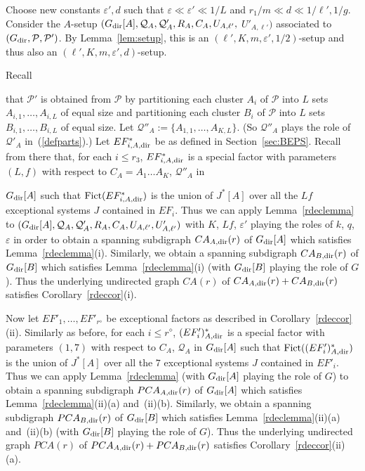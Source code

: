 \documentclass{memo-l}
\def\COMMENT#1{}
\def\cP{\mathcal{P}}
\def\eps{\varepsilon}
\numberwithin{section}{chapter}
\numberwithin{equation}{section}
\numberwithin{firstthm}{section}
\numberwithin{figure}{section}
\begin{document}
{\removelastskip{}\medskip{}
Choose  new constants $\eps', d$ such that $\eps\ll \eps'\ll 1/L$ and $r_1/m\ll d\ll 1/\ell',1/g$.
Consider the $A$-setup $(G_{\rm dir}[A], \mathcal{Q}_A , \mathcal{Q}'_A ,R_{A},C_{A},U_{A,\ell'},$ $U'_{A,\ell'})$ associated to $(G_{\rm dir},\cP,\cP')$.
By Lemma~\ref{lem:setup}, this
is an $(\ell',K,m,\eps',1/2)$-setup and thus also an $(\ell',K,m,\eps',d)$-setup.

Recall%
    \COMMENT{Daniela: new stuff}
that $\mathcal{P}'$ is obtained from $\mathcal{P}$ by partitioning each cluster $A_i$ of $\mathcal{P}$ into $L$ sets $A_{i,1},\dots,A_{i,L}$
of equal size and partitioning each cluster $B_i$ of $\mathcal{P}$ into $L$ sets $B_{i,1},\dots,B_{i,L}$ of equal size.
Let $\mathcal{Q}''_A:=\{A_{1,1},\dots,A_{K,L}\}$. (So $\mathcal{Q}''_A$ plays the role of $\mathcal{Q}'_A$ in~(\ref{defparts}).)
Let $EF^*_{i,A,{\rm dir}}$ be as defined in Section~\ref{sec:BEPS}.
Recall from there that, for each $i\le r_3$, $EF^*_{i,A,{\rm dir}}$ is a special factor with parameters $(L,f)$ with respect to
$C_A =A_1 \dots A_K$, $\mathcal{Q}''_A$ in%
    \COMMENT{Daniela: replaced $\mathcal{Q}'_A$ by $\mathcal{Q}''_A$}
$G_{\rm dir}[A]$ such that
${\rm Fict}(EF^*_{i,A,{\rm dir}})$ is the union of $J^*[A]$ over all the $Lf$ exceptional systems $J$ contained in $EF_{i}$.
Thus we can apply Lemma~\ref{rdeclemma} to $(G_{\rm dir}[A], \mathcal{Q}_A , \mathcal{Q}'_A ,R_{A},C_{A},U_{A,\ell'},U'_{A,\ell'})$
with $K$, $Lf$, $\eps'$ playing the roles of $k$, $q$, $\eps$ in order to obtain a spanning subdigraph $CA_{A,{\rm dir}}(r)$
of $G_{\rm dir}[A]$ which satisfies Lemma~\ref{rdeclemma}(i). 
Similarly, we obtain a spanning subdigraph $CA_{B,{\rm dir}}(r)$ of $G_{\rm dir}[B]$ which satisfies Lemma~\ref{rdeclemma}(i)
(with $G_{{\rm dir}}[B]$ playing the role of $G$). 
Thus the underlying undirected graph $CA(r)$ of $CA_{A,{\rm dir}}(r) + CA_{B,{\rm dir}}(r)$ satisfies Corollary~\ref{rdeccor}(i). 

Now let $EF'_1,\dots, EF'_{r^\diamond}$ be exceptional factors as described in Corollary~\ref{rdeccor}(ii).
Similarly as before, for each $i\le r^\diamond$, $(EF'_i)^*_{A,{\rm dir}}$ is a special factor
with parameters $(1,7)$ with respect to $C_A$, $\mathcal{Q}_A$ in $G_{\rm dir}[A]$ such that
${\rm Fict}((EF'_i)^*_{A,{\rm dir}})$ is the union of $J^*[A]$ over all the $7$ exceptional systems $J$ contained in $EF'_i$.
Thus we can apply Lemma~\ref{rdeclemma} (with $G_{{\rm dir}}[A]$ playing the role of $G$) to obtain a spanning subdigraph $PCA_{A,{\rm dir}}(r)$
of $G_{\rm dir}[A]$ which satisfies Lemma~\ref{rdeclemma}(ii)(a) and~(ii)(b).
Similarly, we obtain a spanning subdigraph $PCA_{B,{\rm dir}}(r)$ of $G_{\rm dir}[B]$ which satisfies Lemma~\ref{rdeclemma}(ii)(a) and~(ii)(b)
(with $G_{{\rm dir}}[B]$ playing the role of $G$).
Thus the underlying undirected graph $PCA(r)$ of $PCA_{A,{\rm dir}}(r) + PCA_{B,{\rm dir}}(r)$ satisfies Corollary~\ref{rdeccor}(ii)(a).

}
\end{document}
